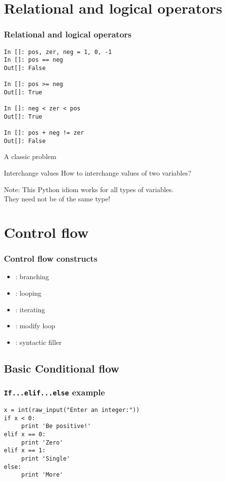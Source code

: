 \documentclass[14pt,compress]{beamer}
\newcounter{time}
\newcommand{\inctime}[1]{\addtocounter{time}{#1}{\tiny \thetime\ m}}
\newcommand{\typ}[1]{\texttt{#1}}
\newcommand{\kwrd}[1]{ \texttt{\textbf{\color{blue}{#1}}}  }
\begin{document}
\section{Relational and logical operators}
\begin{frame}[fragile]
  \frametitle{Relational and logical operators}
  \begin{lstlisting}
In []: pos, zer, neg = 1, 0, -1
In []: pos == neg
Out[]: False

In []: pos >= neg
Out[]: True

In []: neg < zer < pos
Out[]: True

In []: pos + neg != zer
Out[]: False
  \end{lstlisting}
\inctime{5}
\end{frame}

\begin{frame}
  {A classic problem}
  \begin{block}
    {Interchange values}
    How to interchange values of two variables? 
  \end{block}
  \pause
  \begin{block}{Note:}
    This Python idiom works for all types of variables.\\
They need not be of the same type!
  \end{block}
  \inctime{}
\end{frame}

\section{Control flow}
\begin{frame}
  \frametitle{Control flow constructs}  
  \begin{itemize}
  \item \kwrd{if/elif/else}: branching
  \item \kwrd{while}: looping
  \item \kwrd{for}: iterating 
  \item \kwrd{break, continue}: modify loop 
  \item \kwrd{pass}: syntactic filler
  \end{itemize}
\end{frame}

\subsection{Basic Conditional flow}
\begin{frame}[fragile]
  \frametitle{\typ{If...elif...else} example}
\begin{lstlisting}
x = int(raw_input("Enter an integer:"))
if x < 0:
     print 'Be positive!'
elif x == 0:
     print 'Zero'
elif x == 1:
     print 'Single'
else:
     print 'More'
\end{lstlisting}
\end{frame}
\end{document}
